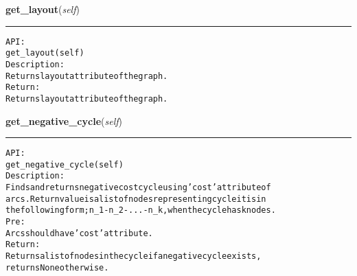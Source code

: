     \label{coinor:gimpy:graph:Graph:get_layout}

    \vspace{0.5ex}

\hspace{.8\funcindent}\begin{boxedminipage}{\funcwidth}

    \raggedright \textbf{get\_layout}(\textit{self})

    \vspace{-1.5ex}

    \rule{\textwidth}{0.5\fboxrule}
\setlength{\parskip}{2ex}
\begin{alltt}

API:
    get\_layout(self)
Description:
Returns layout attribute of the graph.
Return:
    Returns layout attribute of the graph.
\end{alltt}

\setlength{\parskip}{1ex}
    \end{boxedminipage}

    \label{coinor:gimpy:graph:Graph:get_negative_cycle}

    \vspace{0.5ex}

\hspace{.8\funcindent}\begin{boxedminipage}{\funcwidth}

    \raggedright \textbf{get\_negative\_cycle}(\textit{self})

    \vspace{-1.5ex}

    \rule{\textwidth}{0.5\fboxrule}
\setlength{\parskip}{2ex}
\begin{alltt}

API:
    get\_negative\_cycle(self)
Description:
    Finds and returns negative cost cycle using 'cost' attribute of
    arcs. Return value is a list of nodes representing cycle it is in
    the following form; n\_1-n\_2-...-n\_k, when the cycle has k nodes.
Pre:
    Arcs should have 'cost' attribute.
Return:
    Returns a list of nodes in the cycle if a negative cycle exists,
    returns None otherwise.
\end{alltt}

\setlength{\parskip}{1ex}
    \end{boxedminipage}

